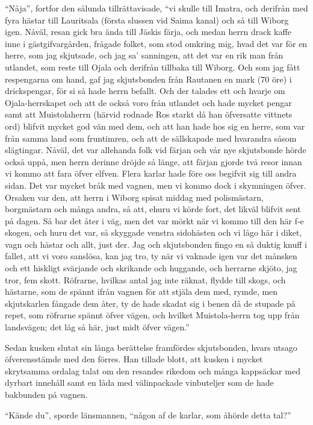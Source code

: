 ``Nåja'', fortfor den sålunda tillrättavisade, ``vi skulle till Imatra,
och derifrån med fyra hästar till Lauritsala (första slussen vid Saima
kanal) och så till Wiborg igen. Nåväl, resan gick bra ända till Jäskis
färja, och medan herrn drack kaffe inne i gästgifvargården, frågade
folket, som stod omkring mig, hvad det var för en herre, som jag
skjutsade, och jag sa' sanningen, att det var en rik man från utlandet,
som reste till Ojala och derifrån tillbaka till Wiborg. Och som jag fått
respengarna om hand, gaf jag skjutsbonden från Rautanen en mark (70 öre)
i drickspengar, för si så hade herrn befallt. Och der talades ett och
hvarje om Ojala-herrskapet och att de också voro från utlandet och hade
mycket pengar samt att Muistolaherrn (härvid rodnade Ros starkt då han
öfversatte vittnets ord) blifvit mycket god vän med dem, och att han
hade hos sig en herre, som var från samma land som fruntimren, och att
de sällskapade med hvarandra såsom slägtingar. Nåväl, det var allehanda
folk vid färjan och vår nye skjutsbonde hörde också uppå, men herrn
derinne dröjde så länge, att färjan gjorde två resor innan vi kommo att
fara öfver elfven. Flera karlar hade före oss begifvit sig till andra
sidan. Det var mycket bråk med vagnen, men vi kommo dock i skymningen
öfver. Orsaken var den, att herrn i Wiborg spisat middag med
polismästarn, borgmästarn och många andra, så att, ehuru vi körde fort,
det likväl blifvit sent på dagen. Så bar det åter i väg, men det var
mörkt när vi kommo till den här f-e skogen, och huru det var, så
skyggade venstra sidohästen och vi lågo här i diket, vagn och hästar och
allt, just der. Jag och skjutsbonden fingo en så duktig knuff i fallet,
att vi voro sanslösa, kan jag tro, ty när vi vaknade igen var det
månsken och ett hiskligt svärjande och skrikande och huggande, och
herrarne skjöto, jag tror, fem skott. Röfrarne, hvilkas antal jag inte
räknat, flydde till skogs, och hästarne, som de spännt ifrån vagnen för
att stjäla dem med, rymde, men skjutskarlen fångade dem åter, ty de hade
skadat sig i benen då de stupade på repet, som röfrarne spännt öfver
vägen, och hvilket Muistola-herrn tog upp från landsvägen; det låg så
här, just midt öfver vägen.''

Sedan kusken slutat sin långa berättelse framfördes skjutsbonden, hvars
utsago öfverensstämde med den förres. Han tillade blott, att kusken i
mycket skrytsamma ordalag talat om den resandes rikedom och många
kappsäckar med dyrbart innehåll samt en låda med välinpackade
vinbuteljer som de hade bakbunden på vagnen.

``Kände du'', sporde länsmannen, ``någon af de karlar, som åhörde detta
tal?''

